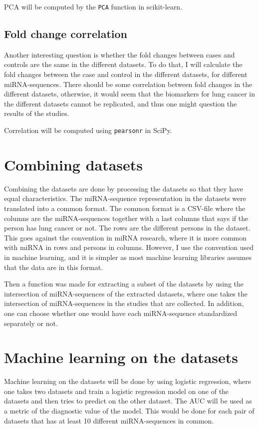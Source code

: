 PCA will be computed by the \verb|PCA| function in scikit-learn.

\subsection{Fold change correlation}
Another interesting question is whether the fold changes between cases and controls are the same in the different datasets. To do that, I will calculate the fold changes between the case and control in the different datasets, for different miRNA-sequences. There should be some correlation between fold changes in the different datasets, otherwise, it would seem that the biomarkers for lung cancer in the different datasets cannot be replicated, and thus one might question the results of the studies. 

Correlation will be computed using \verb|pearsonr| in SciPy.

\section{Combining datasets}
Combining the datasets are done by processing the datasets so that they have equal characteristics. The miRNA-sequence representation in the datasets were translated into a common format. The common format is a CSV-file where the columns are the miRNA-sequences together with a last columns that says if the person has lung cancer or not. The rows are the different persons in the dataset. This goes against the convention in miRNA research, where it is more common with miRNA in rows and persons in columns. However, I use the convention used in machine learning, and it is simpler as most machine learning libraries assumes that the data are in this format.

Then a function was made for extracting a subset of the datasets by using the intersection of miRNA-sequences of the extracted datasets, where one takes the intersection of miRNA-sequences in the studies that are collected. In addition, one can choose whether one would have each miRNA-sequence standardized separately or not. 


\section{Machine learning on the datasets}
Machine learning on the datasets will be done by using logistic regression, where one takes two datasets and train a logistic regression model on one of the datasets and then tries to predict on the other dataset. The AUC will be used as a metric of the diagnostic value of the model. This would be done for each pair of datasets that has at least 10 different miRNA-sequences in common.

